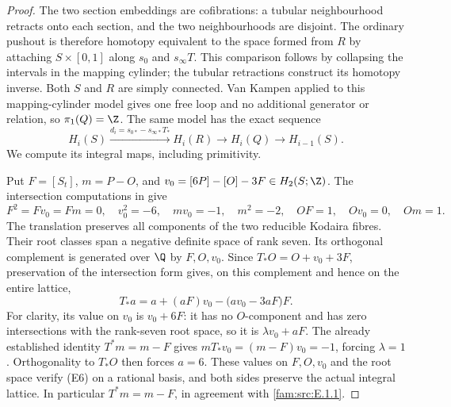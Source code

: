 \begin{proof}
The two section embeddings are cofibrations: a tubular neighbourhood
retracts onto each section, and the two neighbourhoods are disjoint.
The ordinary pushout is therefore homotopy equivalent to the space
formed from $R$ by attaching $S\times[0,1]$ along
$s_0$ and $s_\infty T$. This comparison follows by collapsing the
intervals in the mapping cylinder; the tubular retractions construct
its homotopy inverse. Both $S$ and $R$ are simply connected. Van
Kampen applied to this mapping-cylinder model gives one free loop
and no additional generator or relation, so $\pi_1(Q)=\Z$.
The same model has the exact sequence
\[
 H_i(S)\xrightarrow{d_i=s_{0*}-s_{\infty*}T_*}H_i(R)
 \longrightarrow H_i(Q)\longrightarrow H_{i-1}(S).             \tag{E4}
\]
We compute its integral maps, including primitivity.

Put $F=[S_t]$, $m=P-O$, and
$v_0=[6P]-[O]-3F\in H_2(S;\Z)$. The intersection computations in
\cite[Lemma 2.1]{Engel2026} give
\[
 F^2=Fv_0=Fm=0,\quad v_0^2=-6,\quad mv_0=-1,\quad m^2=-2,
 \quad OF=1,\quad Ov_0=0,\quad Om=1.                         \tag{E5}
\]
The translation preserves all components of the two reducible
Kodaira fibres. Their root classes span a negative definite space of
rank seven. Its orthogonal complement is generated over $\Q$ by
$F,O,v_0$. Since $T_*O=O+v_0+3F$, preservation of the intersection
form gives, on this complement and hence on the entire lattice,
\[
 T_*a=a+(aF)v_0-\bigl(av_0-3aF\bigr)F.                       \tag{E6}
\]
For clarity, its value on $v_0$ is $v_0+6F$: it has no $O$-component
and has zero intersections with the rank-seven root space, so it is
$\lambda v_0+aF$. The already established identity $T^*m=m-F$ gives
$mT_*v_0=(m-F)v_0=-1$, forcing $\lambda=1$. Orthogonality to
$T_*O$ then forces $a=6$. These
values on $F,O,v_0$ and the root space verify (E6) on a rational basis,
and both sides preserve the actual integral lattice. In particular
$T^*m=m-F$, in agreement with \ref{fam:src:E.1.1}.


\end{proof}
